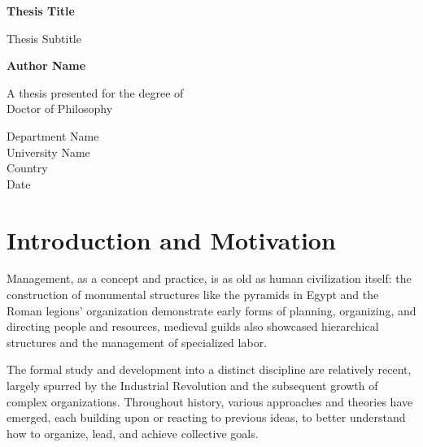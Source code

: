 \documentclass{article}
\begin{document}
\begin{titlepage}
   \begin{center}
       \vspace*{1cm}

       \textbf{Thesis Title}

       \vspace{0.5cm}
        Thesis Subtitle
            
       \vspace{1.5cm}

       \textbf{Author Name}

       \vfill
            
       A thesis presented for the degree of\\
       Doctor of Philosophy
            
       \vspace{0.8cm}
     
       
            
       Department Name\\
       University Name\\
       Country\\
       Date
            
   \end{center}
\end{titlepage}
\tableofcontents
\newpage
\section{Introduction and Motivation}
Management, as a concept and practice, is as old as human civilization itself: the construction of monumental structures like the pyramids in Egypt and the Roman legions' organization demonstrate early forms of planning, organizing, and directing people and resources, medieval guilds also showcased hierarchical structures and the management of specialized labor.

The formal study and development into a distinct discipline are relatively recent, largely spurred by the Industrial Revolution and the subsequent growth of complex organizations. Throughout history, various approaches and theories have emerged, each building upon or reacting to previous ideas, to better understand how to organize, lead, and achieve collective goals.
\end{document}
